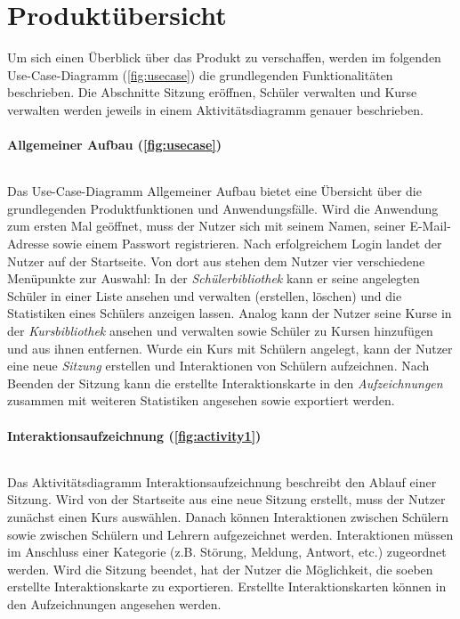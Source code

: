\section{Produktübersicht}

Um sich einen Überblick über das Produkt zu verschaffen, werden im folgenden Use-Case-Diagramm (\autoref{fig:usecase}) die grundlegenden Funktionalitäten beschrieben. Die Abschnitte \frqq Sitzung eröffnen\flqq{}, \frqq Schüler verwalten\flqq{} und \frqq Kurse verwalten\flqq{} werden jeweils in einem Aktivitätsdiagramm genauer beschrieben.

\paragraph{Allgemeiner Aufbau (\autoref{fig:usecase})} $~$ 

Das Use-Case-Diagramm \frqq Allgemeiner Aufbau\flqq{} bietet eine Übersicht über die grundlegenden Produktfunktionen und Anwendungsfälle. Wird die Anwendung zum ersten Mal geöffnet, muss der Nutzer sich mit seinem Namen, seiner E-Mail-Adresse sowie einem Passwort registrieren. Nach erfolgreichem \Gls{Login} landet der Nutzer auf der Startseite. Von dort aus stehen dem Nutzer vier verschiedene Menüpunkte zur Auswahl: In der \textit{Schülerbibliothek} kann er seine angelegten Schüler in einer Liste ansehen und verwalten (erstellen, löschen) und die Statistiken eines Schülers anzeigen lassen. Analog kann der Nutzer seine Kurse in der \textit{Kursbibliothek} ansehen und verwalten sowie Schüler zu Kursen hinzufügen und aus ihnen entfernen. Wurde ein Kurs mit Schülern angelegt, kann der Nutzer eine neue \textit{Sitzung} erstellen und Interaktionen von Schülern aufzeichnen. Nach Beenden der Sitzung kann die erstellte Interaktionskarte in den \textit{Aufzeichnungen} zusammen mit weiteren Statistiken angesehen sowie exportiert werden.

\paragraph{Interaktionsaufzeichnung (\autoref{fig:activity1})} $~$ 

Das Aktivitätsdiagramm \frqq Interaktionsaufzeichnung\flqq{} beschreibt den Ablauf einer Sitzung. Wird von der Startseite aus eine neue Sitzung erstellt, muss der Nutzer zunächst einen Kurs auswählen. Danach können Interaktionen zwischen Schülern sowie zwischen Schülern und Lehrern aufgezeichnet werden. Interaktionen müssen im Anschluss einer Kategorie (z.B. Störung, Meldung, Antwort, etc.) zugeordnet werden. Wird die Sitzung beendet, hat der Nutzer die Möglichkeit, die soeben erstellte Interaktionskarte zu exportieren. Erstellte Interaktionskarten können in den Aufzeichnungen angesehen werden.

